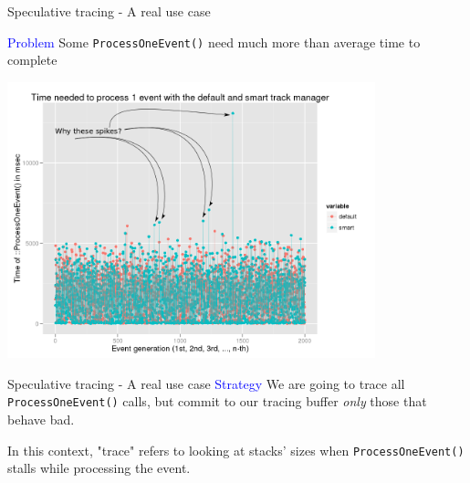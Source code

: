 \documentclass{beamer}
\begin{document}
\begin{frame}{Speculative tracing - A real use case}

\textcolor{blue}{Problem} Some {\tt ProcessOneEvent()} need much more than
average time to complete

\begin{center}
  \includegraphics[width=0.8\textwidth]{evts1-arrows.png}
\end{center}
\end{frame}

\begin{frame}{Speculative tracing - A real use case}
\textcolor{blue}{Strategy} We are going to trace all {\tt ProcessOneEvent()} calls, but commit to our tracing
buffer \textit{only} those that behave bad.

\vspace{5mm}

In this context, "trace" refers to looking at stacks' sizes when {\tt ProcessOneEvent()}
stalls while processing the event.

\end{frame}
\end{document}

